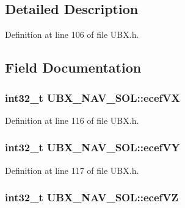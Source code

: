\subsection{\-Detailed \-Description}


\-Definition at line 106 of file \-U\-B\-X.\-h.



\subsection{\-Field \-Documentation}
\hypertarget{struct_u_b_x___n_a_v___s_o_l_aafca9f9204a38e9bb1646848cafcfb38}{
\subsubsection[{ecef\-V\-X}]{\setlength{\rightskip}{0pt plus 5cm}int32\-\_\-t {\bf \-U\-B\-X\-\_\-\-N\-A\-V\-\_\-\-S\-O\-L\-::ecef\-V\-X}}}\label{struct_u_b_x___n_a_v___s_o_l_aafca9f9204a38e9bb1646848cafcfb38}


\-Definition at line 116 of file \-U\-B\-X.\-h.

\hypertarget{struct_u_b_x___n_a_v___s_o_l_a579b66433d3effbb0ad527acae2f8379}{
\subsubsection[{ecef\-V\-Y}]{\setlength{\rightskip}{0pt plus 5cm}int32\-\_\-t {\bf \-U\-B\-X\-\_\-\-N\-A\-V\-\_\-\-S\-O\-L\-::ecef\-V\-Y}}}\label{struct_u_b_x___n_a_v___s_o_l_a579b66433d3effbb0ad527acae2f8379}


\-Definition at line 117 of file \-U\-B\-X.\-h.

\hypertarget{struct_u_b_x___n_a_v___s_o_l_a3bc6214c289d81550f8750382540c2ec}{
\subsubsection[{ecef\-V\-Z}]{\setlength{\rightskip}{0pt plus 5cm}int32\-\_\-t {\bf \-U\-B\-X\-\_\-\-N\-A\-V\-\_\-\-S\-O\-L\-::ecef\-V\-Z}}}\label{struct_u_b_x___n_a_v___s_o_l_a3bc6214c289d81550f8750382540c2ec}


